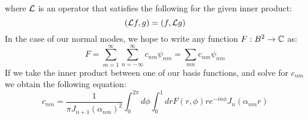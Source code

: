 \documentclass{article}
\begin{document}
where $\mathcal{L}$ is an operator that satisfies the following for the given inner product:
\begin{equation}
  (\mathcal{L} f,g) = (f,\mathcal{L} g)
\end{equation}
In the case of our normal modes, we hope to write any function $F:B^2\rightarrow\mathbb{C}$ as:
\begin{equation}
  \boxed{
    F = \sum_{m = 1}^\infty\sum_{n = -\infty}^\infty c_{nm} \psi_{nm} = \sum_{nm} c_{nm}\psi_{nm}
  }
\end{equation}
If we take the inner product between one of our basis functions, and solve for $c_{nm}$ we obtain the following equation:
\begin{equation}
  \boxed{
    c_{nm} = \frac{1}{\pi J_{n+1}(\alpha_{nm})^2}\int_0^{2\pi} d\phi\int_0^1 dr F(r,\phi) r e^{- i n \phi}J_n(\alpha_{nm} r)
  }
\end{equation}
\end{document}
